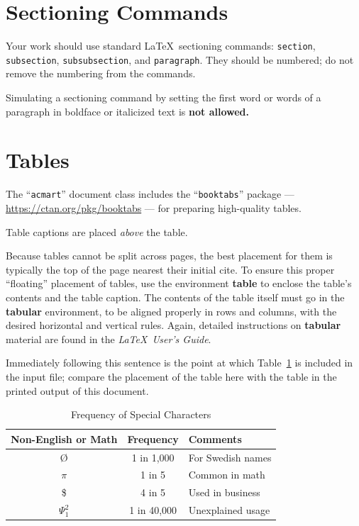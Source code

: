 \documentclass[acmlarge]{acmart}
\begin{document}
	\section{Sectioning Commands}
	
	Your work should use standard \LaTeX\ sectioning commands:
	\verb|section|, \verb|subsection|, \verb|subsubsection|, and
	\verb|paragraph|. They should be numbered; do not remove the numbering
	from the commands.
	
	Simulating a sectioning command by setting the first word or words of
	a paragraph in boldface or italicized text is {\bfseries not allowed.}
	
	\section{Tables}
	
	The ``\verb|acmart|'' document class includes the ``\verb|booktabs|''
	package --- \url{https://ctan.org/pkg/booktabs} --- for preparing
	high-quality tables.
	
	Table captions are placed {\itshape above} the table.
	
	Because tables cannot be split across pages, the best placement for
	them is typically the top of the page nearest their initial cite.  To
	ensure this proper ``floating'' placement of tables, use the
	environment \textbf{table} to enclose the table's contents and the
	table caption.  The contents of the table itself must go in the
	\textbf{tabular} environment, to be aligned properly in rows and
	columns, with the desired horizontal and vertical rules.  Again,
	detailed instructions on \textbf{tabular} material are found in the
	\textit{\LaTeX\ User's Guide}.
	
	Immediately following this sentence is the point at which
	Table~\ref{tab:freq} is included in the input file; compare the
	placement of the table here with the table in the printed output of
	this document.
	
	\begin{table}
		\caption{Frequency of Special Characters}
		\label{tab:freq}
		\begin{tabular}{ccl}
			\toprule
			Non-English or Math&Frequency&Comments\\
			\midrule
			\O & 1 in 1,000& For Swedish names\\
			$\pi$ & 1 in 5& Common in math\\
			\$ & 4 in 5 & Used in business\\
			$\Psi^2_1$ & 1 in 40,000& Unexplained usage\\
			\bottomrule
		\end{tabular}
	\end{table}
	
\end{document}
